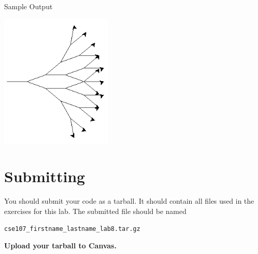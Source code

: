 \documentclass[11pt]{cselabheader}
\begin{document}
\begin{ex}[navigate3.py]
  Sample Output
  \begin{center}
    \includegraphics[width=0.4\textwidth]{img/nav3_example}
  \end{center}
\end{ex}

\pagebreak
\section{Submitting}
You should submit your code as a tarball. It should contain all files
used in the exercises for this lab. The submitted file should be named
\begin{center}
  \texttt{cse107\_firstname\_lastname\_lab8.tar.gz}
\end{center}

\begin{center}
  \textbf{Upload your tarball to Canvas.}
\end{center}

\listofexercises
\end{document}
